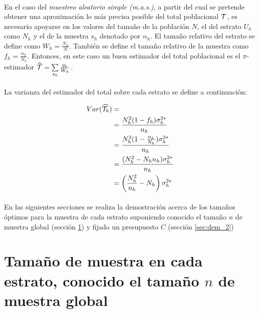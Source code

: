 \documentclass{article}
\begin{document}
    \paragraph{}
    En el caso del \emph{muestreo aleatorio simple (m.a.s.)}, a partir del cual se pretende obtener una aproximación lo más precisa posible del total poblacional $\mathcal{T}$, es necesario apoyarse en los valores del tamaño de la población $N$, el del estrato $U_h$ como $N_h$ y el de la muestra $s_h$ denotado por $n_h$. El tamaño relativo del estrato se define como $W_h = \frac{N_h}{N}$. También se define el tamaño relativo de la muestra como $f_h = \frac{n_h}{N_h}$. Entonces, en este caso un buen estimador del total poblacional es el $\pi$-estimador $\widehat{\mathcal{T}} = \sum\limits_{s_h} \frac{y_k}{W_h}$.

    \paragraph{}
    La varianza del estimador del total sobre cada estrato se define a continuación:

    \begin{align}
      \begin{split}
        Var(\widehat{\mathcal{T}_h}) &= \\
        &=\frac{N_h^2 (1-f_h)\sigma_h^{2*}}{n_h} \\
        &= \frac{N_h^2 (1-\frac{n_h}{N_h})\sigma_h^{2*}}{n_h} \\
        &= \frac{(N_h^2- N_hn_h)\sigma_h^{2*}}{n_h} \\
        &= \left(\frac{N_h^2}{n_h}- N_h\right)\sigma_h^{2*}
      \end{split}
    \end{align}

    \paragraph{}
    En las siguientes secciones se realiza la demostración acerca de los tamaños óptimos para la muestra de cada estrato suponiendo conocido el tamaño $n$ de muestra global (sección \ref{sec:dem_1}) y fijado un presupuesto $C$ (sección \ref{sec:dem_2})


    \section{Tamaño de muestra en cada estrato, conocido el tamaño $n$ de muestra global}
    \label{sec:dem_1}
\end{document}
